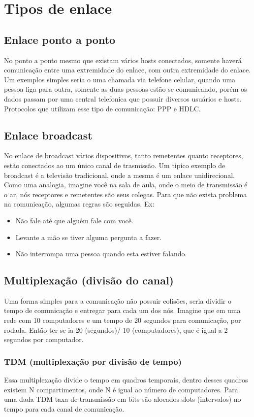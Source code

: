 \documentclass[12pt]{article}
\begin{document}
\section{Tipos de enlace}
\subsection{Enlace ponto a ponto}
No ponto a ponto mesmo que existam vários hosts conectados, somente haverá comunicação entre uma extremidade do enlace, com outra extremidade do enlace. Um exemplos simples seria o uma chamada via telefone celular, quando uma pessoa liga para outra, somente as duas pessoas estão se comunicando, porém os dados passam por uma central telefonica que possuir diversos usuários e hosts. Protocolos que utilizam esse tipo de comunicação: PPP e HDLC.

\subsection{Enlace broadcast}
No enlace de broadcast vários dispositivos, tanto remetentes quanto receptores, estão conectados ao um único canal de trasmissão. Um tipíco exemplo de broadcast é a televisão tradicional, onde a mesma é um enlace unidirecional. Como uma analogia, imagine você na sala de aula, onde o meio de transmissão é o ar, nós receptores e remetentes são seus colegas. Para que não exista problema na comunicação, algumas regras são seguidas.
Ex:

\begin{itemize}
  \item Não fale até que alguém fale com você.
  \item Levante a mão se tiver alguma pergunta a fazer.
  \item Não interrompa uma pessoa quando esta estiver falando.
\end{itemize}

\subsection{Multiplexação (divisão do canal)}
Uma forma simples para a comunicação não possuir colisões, seria dividir o tempo de comunicação e entregar para cada um dos nós. Imagine que em uma rede com 10 computadores e um tempo de 20 segundos para comunicação, por rodada. Então ter-se-ia 20 (segundos)/ 10 (computadores), que é igual a 2 segundos por computador.

\subsubsection{TDM (multiplexação por divisão de tempo)}
Essa multiplexação divide o tempo em quadros temporais, dentro desses quadros existem N compartimentos, onde N é igual ao número de computadores. Para uma dada TDM taxa de transmissão em bits são alocados slots (intervalos) no tempo para cada canal de comunicação.
\end{document}
